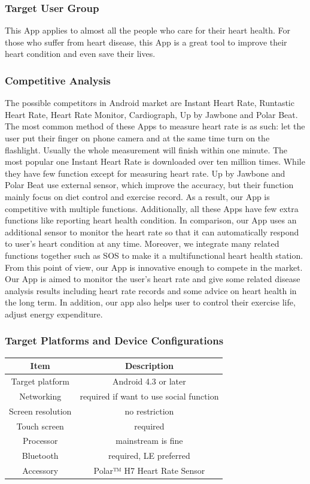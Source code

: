 \documentclass[10pt,a4paper,final]{scrartcl}
\begin{document}
\subsubsection{Target User Group}
This App applies to almost all the people who care for their heart health. For those who suffer from heart disease, this App is a great tool to improve their heart condition and even save their lives. 
\subsubsection{Competitive Analysis}
The possible competitors in Android market are Instant Heart Rate, Runtastic Heart Rate, Heart Rate Monitor, Cardiograph, Up by Jawbone and Polar Beat. The most common method of these Apps to measure heart rate is as such: let the user put their finger on phone camera and at the same time turn on the flashlight. Usually the whole measurement will finish within one minute. The most popular one Instant Heart Rate is downloaded over ten million times. While they have few function except for measuring heart rate. Up by Jawbone and Polar Beat use external sensor, which improve the accuracy, but their function mainly focus on diet control and exercise record. As a result, our App is competitive with multiple functions. Additionally, all these Apps have few extra functions like reporting heart health condition. In comparison, our App uses an additional sensor to monitor the heart rate so that it can automatically respond to user's heart condition at any time. Moreover, we integrate many related functions together such as SOS to make it a multifunctional heart health station. From this point of view, our App is innovative enough to compete in the market. Our App is aimed to monitor the user's heart rate and give some related disease analysis results including heart rate records and some advice on heart health in the long term. In addition, our app also helps user to control their exercise life, adjust energy expenditure. 
\subsubsection{Target Platforms and Device Configurations}
\begin{tabular}{|c|c|}
\hline 
Item & Description \\ 
\hline 
Target platform & Android 4.3 or later \\
Networking & required if want to use social function \\
Screen resolution & no restriction \\
Touch screen & required \\
Processor & mainstream is fine \\
Bluetooth & required, LE preferred \\
Accessory & Polar™ H7 Heart Rate Sensor \\
\hline 
\end{tabular} 
\end{document}
